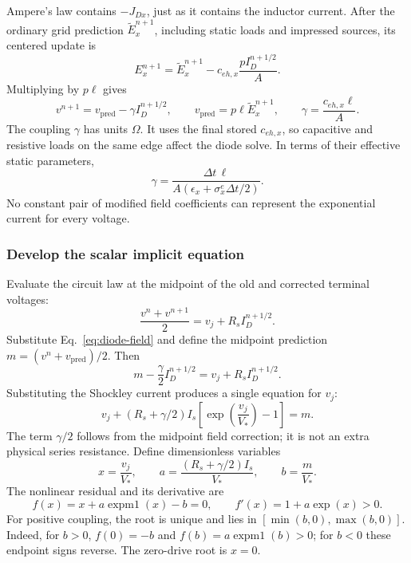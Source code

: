 \documentclass[10pt]{article}
\begin{document}
Ampere's law contains $-J_{Dx}$, just as it contains the inductor
current. After the ordinary grid prediction $\widetilde E_x^{n+1}$,
including static loads and impressed sources, its centered update is
\begin{equation}
    E_x^{n+1}=\widetilde E_x^{n+1}
                   -c_{eh,x}\frac{pI_D^{n+1/2}}{A}.
\end{equation}
Multiplying by $p\ell$ gives
\begin{equation}
    \boxed{v^{n+1}=v_{\mathrm{pred}}-\gamma I_D^{n+1/2},\qquad
       v_{\mathrm{pred}}=p\ell\widetilde E_x^{n+1},\qquad
       \gamma=\frac{c_{eh,x}\ell}{A}.}
    \label{eq:diode-field}
\end{equation}
The coupling $\gamma$ has units $\Omega$. It uses the final stored
$c_{eh,x}$, so capacitive and resistive loads on the same edge affect
the diode solve. In terms of their effective static parameters,
\begin{equation}
    \gamma=\frac{\Delta t\,\ell}
                    {A(\epsilon_x+\sigma_x^e\Delta t/2)}.
\end{equation}
No constant pair of modified field coefficients can represent the
exponential current for every voltage.

\subsubsection{Develop the scalar implicit equation}
Evaluate the circuit law at the midpoint of the old and corrected
terminal voltages:
\begin{equation}
    \frac{v^n+v^{n+1}}{2}=v_j+R_s I_D^{n+1/2}.
\end{equation}
Substitute Eq.~\eqref{eq:diode-field} and define the midpoint prediction
$m=(v^n+v_{\mathrm{pred}})/2$. Then
\begin{equation}
    m-\frac{\gamma}{2}I_D^{n+1/2}=v_j+R_s I_D^{n+1/2}.
\end{equation}
Substituting the Shockley current produces a single equation for $v_j$:
\begin{equation}
    \boxed{v_j+(R_s+\gamma/2)I_s
                  \left[\exp\left(\frac{v_j}{V_*}\right)-1\right]=m.}
    \label{eq:diode-implicit}
\end{equation}
The term $\gamma/2$ follows from the midpoint field correction; it is
not an extra physical series resistance. Define dimensionless variables
\begin{equation}
    x=\frac{v_j}{V_*},\qquad
    a=\frac{(R_s+\gamma/2)I_s}{V_*},\qquad b=\frac{m}{V_*}.
\end{equation}
The nonlinear residual and its derivative are
\begin{equation}
    \boxed{f(x)=x+a\operatorname{expm1}(x)-b=0,\qquad
        f'(x)=1+a\exp(x)>0.}
    \label{eq:diode-residual}
\end{equation}
For positive coupling, the root is unique and lies in
$[\min(b,0),\max(b,0)]$. Indeed, for $b>0$, $f(0)=-b$ and
$f(b)=a\operatorname{expm1}(b)>0$; for $b<0$ these endpoint signs
reverse. The zero-drive root is $x=0$.
\end{document}

